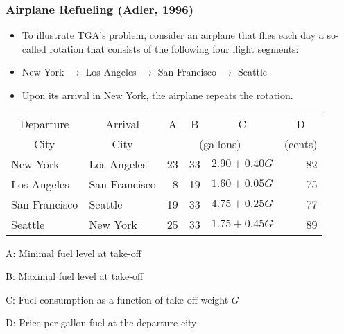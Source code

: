 \documentclass[11pt]{beamer}
\begin{document}
\begin{frame}
\frametitle{Airplane Refueling (Adler, 1996)}
\begin{itemize}
\item To illustrate TGA’s problem, consider an airplane that flies each day a so-called rotation that consists of the following four flight segments:
\item 	New York $\rightarrow$ Los Angeles $\rightarrow$ San Francisco $\rightarrow$ Seattle
\item 	Upon its arrival in New York, the airplane repeats the rotation.
\end{itemize}
\begin{table}[htbp]
  \centering
    \begin{tabular}{llrrlr}
    \multicolumn{1}{c}{Departure}  & \multicolumn{1}{c}{Arrival} & \multicolumn{1}{c}{A} & \multicolumn{1}{c}{B} & \multicolumn{1}{c}{C}     & \multicolumn{1}{c}{D} \\ 
    \multicolumn{1}{c}{City}  & \multicolumn{1}{c}{City} & \multicolumn{3}{c}{(gallons)}  & \multicolumn{1}{c}{(cents)} \\
    \hline
    \hline
    New York & Los Angeles & 23    & 33    & $2.90 + 0.40G$ & 82 \\
    Los Angeles & San Francisco & 8     & 19    & $1.60 + 0.05G$ & 75 \\
    San Francisco & Seattle & 19    & 33    & $4.75 +0.25G$ & 77 \\
    Seattle & New York & 25    & 33    & $1.75+0.45G$ & 89 \\
    \end{tabular}%
\end{table}%
A: Minimal fuel level at take-off

B: Maximal fuel level at take-off

C: Fuel consumption as a function of take-off weight $G$ 

D: Price per gallon fuel at the departure city

\end{frame}
\end{document}
